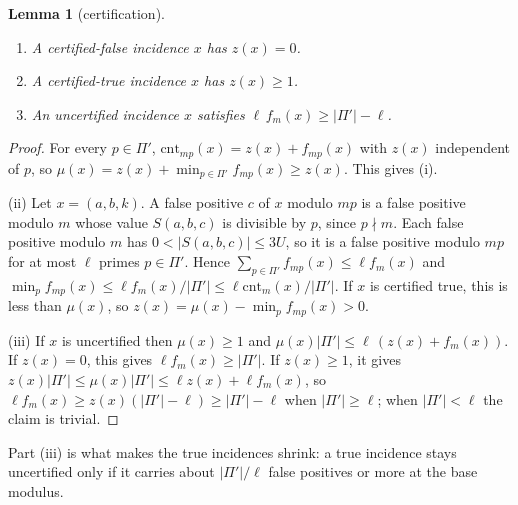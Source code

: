 \documentclass[11pt]{article}
\newtheorem{lemma}[theorem]{Lemma}
\theoremstyle{definition}
\theoremstyle{remark}
\newcommand{\cnt}{\mathrm{cnt}}
\begin{document}
\begin{lemma}[certification]\label{e:lem:cert}
\begin{enumerate}[label=(\roman*),nosep]
\item A certified-false incidence $x$ has $z(x)=0$.
\item A certified-true incidence $x$ has $z(x)\ge1$.
\item An uncertified incidence $x$ satisfies $\ell\,f_m(x)\ge|\Pi'|-\ell$.
\end{enumerate}
\end{lemma}
\begin{proof}
For every $p\in\Pi'$, $\cnt_{mp}(x)=z(x)+f_{mp}(x)$ with $z(x)$ independent of $p$, so $\mu(x)=z(x)+\min_{p\in\Pi'}f_{mp}(x)\ge z(x)$. This gives (i).

(ii) Let $x=(a,b,k)$. A false positive $c$ of $x$ modulo $mp$ is a false positive modulo $m$ whose value $S(a,b,c)$ is divisible by $p$, since $p\nmid m$. Each false positive modulo $m$ has $0<|S(a,b,c)|\le3U$, so it is a false positive modulo $mp$ for at most $\ell$ primes $p\in\Pi'$. Hence $\sum_{p\in\Pi'}f_{mp}(x)\le\ell f_m(x)$ and $\min_pf_{mp}(x)\le\ell f_m(x)/|\Pi'|\le\ell\cnt_m(x)/|\Pi'|$. If $x$ is certified true, this is less than $\mu(x)$, so $z(x)=\mu(x)-\min_pf_{mp}(x)>0$.

(iii) If $x$ is uncertified then $\mu(x)\ge1$ and $\mu(x)|\Pi'|\le\ell\,(z(x)+f_m(x))$. If $z(x)=0$, this gives $\ell f_m(x)\ge|\Pi'|$. If $z(x)\ge1$, it gives $z(x)|\Pi'|\le\mu(x)|\Pi'|\le\ell z(x)+\ell f_m(x)$, so $\ell f_m(x)\ge z(x)(|\Pi'|-\ell)\ge|\Pi'|-\ell$ when $|\Pi'|\ge\ell$; when $|\Pi'|<\ell$ the claim is trivial.
\end{proof}

Part (iii) is what makes the true incidences shrink: a true incidence stays uncertified only if it carries about $|\Pi'|/\ell$ false positives or more at the base modulus.
\end{document}

